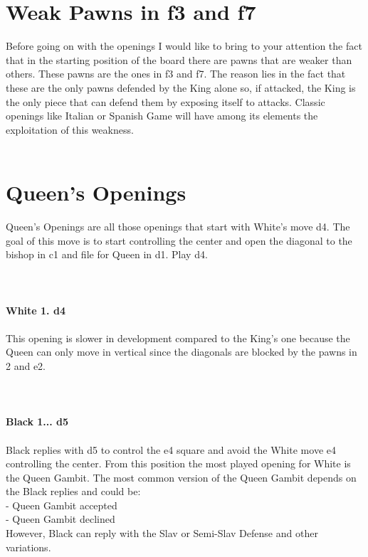 \documentclass{article}
\begin{document}
\section{ Weak Pawns in f3 and f7}

Before going on with the openings I would like to bring to your attention the fact that in the starting position of the board there are pawns that are weaker than others. These pawns are the ones in f3 and f7. The reason lies in the fact that these are the only pawns defended by the King alone so, if attacked, the King is the only piece that can defend them by exposing itself to attacks. Classic openings like Italian or Spanish Game will have among its elements the exploitation of this weakness.\\
\\
\section{ Queen's Openings}

Queen's Openings are all those openings that start with White's move d4. The goal of this move is to start controlling the center and open the diagonal to the bishop in c1 and file for Queen in d1. Play d4.\\
\\

\\
\\
\textbf{White 1. d4}\\
\\
This opening is slower in development compared to the King's one because the Queen can only move in vertical since the diagonals are blocked by the pawns in 2 and e2.\\
\\

\\
\\
\textbf{Black 1... d5}\\
\\
Black replies with d5 to control the e4 square and avoid the White move e4 controlling the center. From this position the most played opening for White is the Queen Gambit. The most common version of the Queen Gambit depends on the Black replies and could be:\\- Queen Gambit accepted\\- Queen Gambit declined\\However, Black can reply with the Slav or Semi-Slav Defense and other variations.\\
\\
\end{document}
